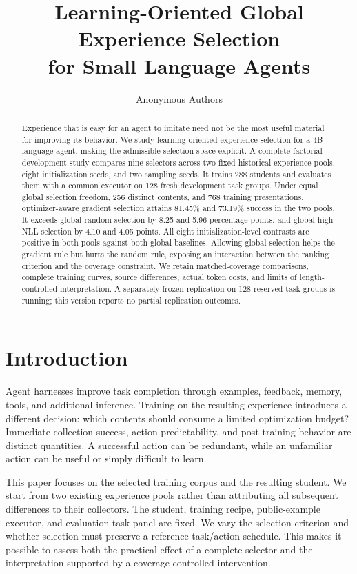 \documentclass{article}
\title{Learning-Oriented Global Experience Selection\\for Small Language Agents}
\author{Anonymous Authors}
\begin{document}
\maketitle
\begin{abstract}
Experience that is easy for an agent to imitate need not be the most useful material for improving its behavior. We study learning-oriented experience selection for a 4B language agent, making the admissible selection space explicit. A complete factorial development study compares nine selectors across two fixed historical experience pools, eight initialization seeds, and two sampling seeds. It trains 288 students and evaluates them with a common executor on 128 fresh development task groups. Under equal global selection freedom, 256 distinct contents, and 768 training presentations, optimizer-aware gradient selection attains 81.45\% and 73.19\% success in the two pools. It exceeds global random selection by 8.25 and 5.96 percentage points, and global high-NLL selection by 4.10 and 4.05 points. All eight initialization-level contrasts are positive in both pools against both global baselines. Allowing global selection helps the gradient rule but hurts the random rule, exposing an interaction between the ranking criterion and the coverage constraint. We retain matched-coverage comparisons, complete training curves, source differences, actual token costs, and limits of length-controlled interpretation. A separately frozen replication on 128 reserved task groups is running; this version reports no partial replication outcomes.
\end{abstract}

\section{Introduction}
Agent harnesses improve task completion through examples, feedback, memory, tools, and additional inference. Training on the resulting experience introduces a different decision: which contents should consume a limited optimization budget? Immediate collection success, action predictability, and post-training behavior are distinct quantities. A successful action can be redundant, while an unfamiliar action can be useful or simply difficult to learn.

This paper focuses on the selected training corpus and the resulting student. We start from two existing experience pools rather than attributing all subsequent differences to their collectors. The student, training recipe, public-example executor, and evaluation task panel are fixed. We vary the selection criterion and whether selection must preserve a reference task/action schedule. This makes it possible to assess both the practical effect of a complete selector and the interpretation supported by a coverage-controlled intervention.
\end{document}
